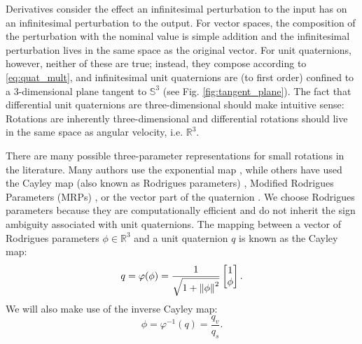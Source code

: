 \documentclass{svproc}
\newcommand{\R}{\mathbb{R}}
\newcommand{\Q}{\mathbb{S}^3}
\begin{document}
        Derivatives consider the effect an infinitesimal perturbation to the input has on an infinitesimal perturbation to the output. For vector spaces, the composition of the perturbation with the nominal value is simple addition and the infinitesimal perturbation lives in the same space as the original vector. For unit quaternions, however, neither of these are true; instead, they compose according to \eqref{eq:quat_mult}, and infinitesimal unit quaternions are (to first order) confined to a 3-dimensional plane tangent to $\Q$ (see Fig. \ref{fig:tangent_plane}).
        The fact that differential unit quaternions are three-dimensional should make intuitive sense: Rotations are inherently three-dimensional and differential rotations should live in the same space as angular velocity, i.e. $\R^3$. 
        
        There are many possible three-parameter representations for small rotations in the literature. Many authors use the exponential map \cite{Baillieul1978,Zefran1998,Lee2008,Saccon2013,Sola2017,Fan2016,watterson2018trajectory}, while others have used the Cayley map (also known as Rodrigues parameters) \cite{Kobilarov2011,Kobilarov2014}, Modified Rodrigues Parameters (MRPs) \cite{Terzakis2018}, or the vector part of the quaternion \cite{Fresk2013}. 
        We choose Rodrigues parameters \cite{markley2014fundamentals} because they are computationally efficient and do not inherit the sign ambiguity associated with unit quaternions. The mapping between a vector of Rodrigues parameters $\phi \in \R^3$ and a unit quaternion $q$ is known as the Cayley map:
        \begin{equation} \label{eq:cayley}
            q = \varphi(\phi) = \frac{1}{\sqrt{1 + \norm{\phi}^2}} \begin{bmatrix} 1 \\ \phi \end{bmatrix}.
        \end{equation}
        We will also make use of the inverse Cayley map:
        \begin{equation}
            \phi = \varphi^{-1}(q) = \frac{q_v}{q_s}.
        \end{equation}
        
\end{document}

